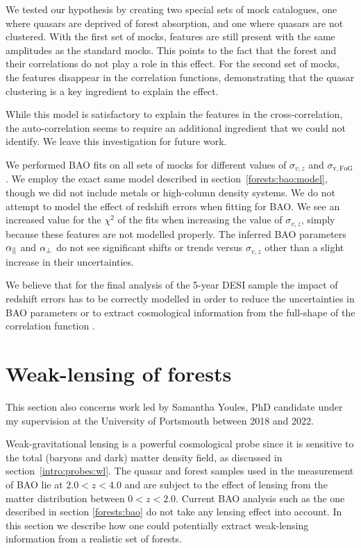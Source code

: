 We tested our hypothesis by creating two special sets of mock catalogues, one 
where quasars are deprived of forest absorption, and one where quasars are 
not clustered. With the first set of mocks, features are still present with the 
same amplitudes as the standard mocks. 
This points to the fact that the \lya forest and their correlations do not play 
a role in this effect. 
For the second set of mocks, the features disappear in the correlation functions, 
demonstrating that the quasar clustering is a key ingredient to explain the effect. 

While this model is satisfactory to explain the features in the cross-correlation, 
the auto-correlation seems to require an additional ingredient that we could not 
identify. We leave this investigation for future work. 

We performed BAO fits on all sets of mocks for different values of 
$\sigma_{v, z}$ and $\sigma_\mathrm{v, FoG}$. We employ the exact same model 
described in section~\ref{forests:bao:model}, though we did not include 
metals or high-column density systems. We do not attempt to model 
the effect of redshift errors when fitting for BAO. 
We see an increased value for the $\chi^2$ of the fits when increasing 
the value of $\sigma_{v, z}$, simply because these features are not modelled
properly. The inferred BAO parameters ${\alpha_\parallel}$ and ${\alpha_\perp}$ do not see 
significant shifts or trends versus $\sigma_{v, z}$ other than a slight increase 
in their uncertainties. 

We believe that for the final analysis of the 5-year DESI sample the impact 
of redshift errors has to be correctly modelled in order to reduce the 
uncertainties in BAO parameters or to extract cosmological information from  
the full-shape of the correlation function \cite{cuceuCosmologyBAO3D2021}.

\section{Weak-lensing of forests}
\label{forests:lensing}

This section also concerns work led by Samantha Youles, PhD candidate under 
my supervision at the University of Portsmouth between 2018 and 2022. 

Weak-gravitational lensing is a powerful cosmological probe since it is 
sensitive to the total (baryons and dark) matter density field, as 
discussed in section~\ref{intro:probes:wl}. The quasar and \lya forest 
samples used in the measurement of BAO lie at $2.0 < z < 4.0$ and are 
subject to the effect of lensing from the matter distribution between 
$0 < z < 2.0$. Current BAO analysis such as the one described in section
\ref{forests:bao} do not take any lensing effect into account. 
In this section we describe how one could potentially extract weak-lensing 
information from a realistic set of \lya forests. 

